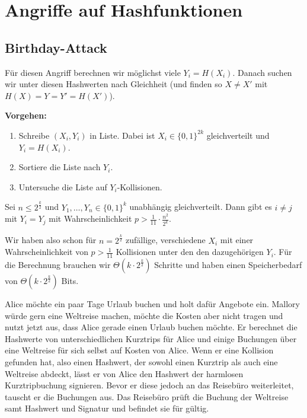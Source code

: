 \section{Angriffe auf Hashfunktionen}
\subsection{Birthday-Attack}
Für diesen Angriff berechnen wir möglichst viele $Y_i = H(X_i)$.
Danach suchen wir unter diesen Hashwerten nach Gleichheit (und finden so $X \not = X'$ mit $H(X) = Y = Y' = H(X')$).
\vspace{10pt}

\textbf{Vorgehen:}
\begin{enumerate}
  \item Schreibe $(X_i, Y_i)$ in Liste. Dabei ist $X_i \in \{0,1\}^{2k}$ gleichverteilt und $Y_i = H(X_i)$.
  \item Sortiere die Liste nach $Y_i$.
  \item Untersuche die Liste auf $Y_i$-Kollisionen.
\end{enumerate}
\vspace{10pt}

\begin{theorem}
Sei $n \leq 2^{\frac{k}{2}}$ und $Y_1, \ldots , Y_n \in \{0,1\}^k$ unabhängig gleichverteilt. Dann gibt es $i \not = j$ mit $Y_i = Y_j$ mit Wahrscheinlichkeit
$p > \frac{1}{11} \cdot \frac{n^2}{2^k}$.
\end{theorem}
\vspace{10pt}

Wir haben also schon für $n = 2^{\frac{k}{2}}$ zufällige, verschiedene $X_i$ mit einer Wahrscheinlichkeit von $p > \frac{1}{11}$ Kollisionen unter den
den dazugehörigen $Y_i$. Für die Berechnung brauchen wir $\Theta(k \cdot 2^{\frac{k}{2}})$ Schritte und haben einen Speicherbedarf von $\Theta(k \cdot
2^{\frac{k}{2}})$ Bits.
\vspace{10pt}

\begin{beispiel}
Alice möchte ein paar Tage Urlaub buchen und holt dafür Angebote ein. Mallory würde gern eine Weltreise machen, möchte die Kosten aber nicht tragen und nutzt
jetzt aus, dass Alice gerade einen Urlaub buchen möchte. Er berechnet die Hashwerte von unterschiedlichen Kurztrips für Alice und einige Buchungen über
eine Weltreise für sich selbst auf Kosten von Alice. Wenn er eine Kollision gefunden hat, also einen Hashwert, der sowohl einen Kurztrip als auch eine
Weltreise abdeckt, lässt er von Alice den Hashwert der harmlosen Kurztripbuchung signieren. Bevor er diese jedoch an das Reisebüro weiterleitet, tauscht er die
Buchungen aus. Das Reisebüro prüft die Buchung der Weltreise samt Hashwert und Signatur und befindet sie für gültig.
\end{beispiel}

